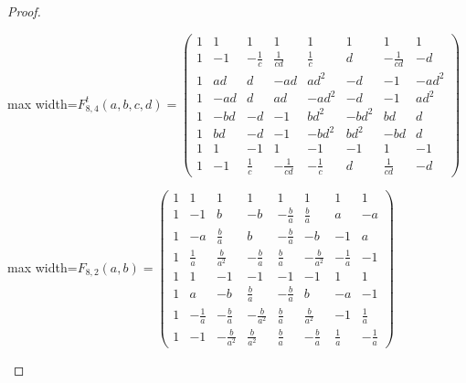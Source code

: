 \documentclass[11pt,a4paper]{article}
\theoremstyle{plain}
\theoremstyle{definition}
\numberwithin{equation}{section}
\begin{document}
\begin{proof}
\begin{center}
\end{center}
\medskip
\begin{center}\small\setlength{\arraycolsep}{3.4pt}
\begin{adjustbox}{max width=\textwidth}$\displaystyle F_{8,4}^{t}(a,b,c,d)=\begin{pmatrix}
1 & 1 & 1 & 1 & 1 & 1 & 1 & 1 \\
1 & -1 & -\frac{1}{c} & \frac{1}{cd} & \frac{1}{c} & d & -\frac{1}{cd} & -d \\
1 & ad & d & -ad & ad^{2} & -d & -1 & -ad^{2} \\
1 & -ad & d & ad & -ad^{2} & -d & -1 & ad^{2} \\
1 & -bd & -d & -1 & bd^{2} & -bd^{2} & bd & d \\
1 & bd & -d & -1 & -bd^{2} & bd^{2} & -bd & d \\
1 & 1 & -1 & 1 & -1 & -1 & 1 & -1 \\
1 & -1 & \frac{1}{c} & -\frac{1}{cd} & -\frac{1}{c} & d & \frac{1}{cd} & -d
\end{pmatrix}$\end{adjustbox}
\end{center}
\medskip
\begin{center}\small\setlength{\arraycolsep}{3.4pt}
\begin{adjustbox}{max width=\textwidth}$\displaystyle F_{8,2}(a,b)=\begin{pmatrix}
1 & 1 & 1 & 1 & 1 & 1 & 1 & 1 \\
1 & -1 & b & -b & -\frac{b}{a} & \frac{b}{a} & a & -a \\
1 & -a & \frac{b}{a} & b & -\frac{b}{a} & -b & -1 & a \\
1 & \frac{1}{a} & \frac{b}{a^{2}} & -\frac{b}{a} & \frac{b}{a} & -\frac{b}{a^{2}} & -\frac{1}{a} & -1 \\
1 & 1 & -1 & -1 & -1 & -1 & 1 & 1 \\
1 & a & -b & \frac{b}{a} & -\frac{b}{a} & b & -a & -1 \\
1 & -\frac{1}{a} & -\frac{b}{a} & -\frac{b}{a^{2}} & \frac{b}{a} & \frac{b}{a^{2}} & -1 & \frac{1}{a} \\
1 & -1 & -\frac{b}{a^{2}} & \frac{b}{a^{2}} & \frac{b}{a} & -\frac{b}{a} & \frac{1}{a} & -\frac{1}{a}
\end{pmatrix}$\end{adjustbox}
\end{center}
\medskip
\begin{center}\small\setlength{\arraycolsep}{3.4pt}
\end{center}
\end{proof}
\end{document}
